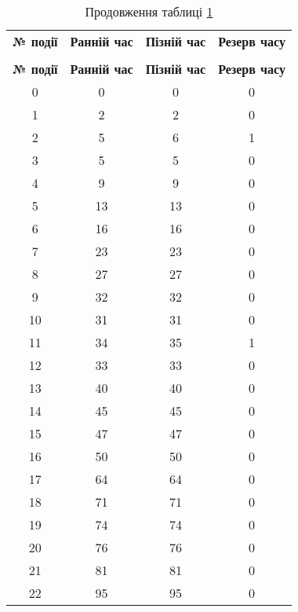 \begin{center}\footnotesize
\begin{longtable}{|c|c|c|c|}

\captionsetup{justification=centering}
\caption{Параметри подій мережевого графіка}\label{t:eco_3}\\
\hline
\multicolumn{1}{|c|}{\textbf{№ події}}&
\multicolumn{1}{c|}{\textbf{Ранній час}}&
\multicolumn{1}{c|}{\textbf{Пізній час}}&
\multicolumn{1}{c|}{\textbf{Резерв часу}}\\\hline

\endfirsthead
\caption*{\hfill Продовження таблиці \ref{t:eco_3}}\\\hline

\multicolumn{1}{|c|}{\textbf{№ події}}&
\multicolumn{1}{c|}{\textbf{Ранній час}}&
\multicolumn{1}{c|}{\textbf{Пізній час}}&
\multicolumn{1}{c|}{\textbf{Резерв часу}}\\\hline
\endhead

0 & 0 & 0 & 0\\ \hline
1 & 2 & 2 & 0\\ \hline
2 & 5 & 6 & 1\\ \hline
3 & 5 & 5 & 0\\ \hline
4 & 9 & 9 & 0\\ \hline
5 & 13 & 13 & 0\\ \hline
6 & 16 & 16 & 0\\ \hline
7 & 23 & 23 & 0\\ \hline
8 & 27 & 27 & 0\\ \hline
9 & 32 & 32 & 0\\ \hline
10 & 31 & 31 & 0\\ \hline
11 & 34 & 35 & 1\\ \hline
12 & 33 & 33 & 0\\ \hline
13 & 40 & 40 & 0\\ \hline
14 & 45 & 45 & 0\\ \hline
15 & 47 & 47 & 0\\ \hline
16 & 50 & 50 & 0\\ \hline
17 & 64 & 64 & 0\\ \hline
18 & 71 & 71 & 0\\ \hline
19 & 74 & 74 & 0\\ \hline
20 & 76 & 76 & 0\\ \hline
21 & 81 & 81 & 0\\ \hline
22 & 95 & 95 & 0\\ \hline

\end{longtable}
\end{center}

